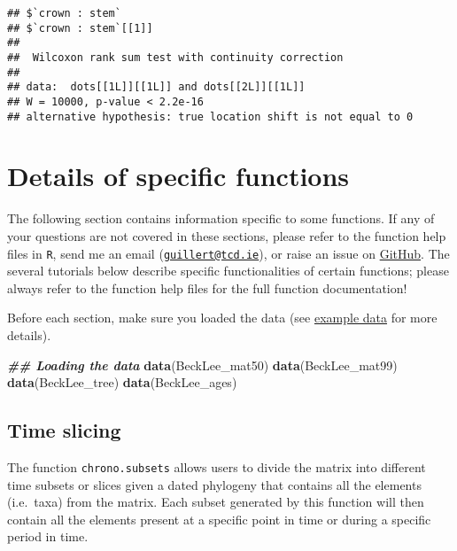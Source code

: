 \documentclass[
]{book}
\newenvironment{Shaded}{\begin{snugshade}}{\end{snugshade}}
\newcommand{\DocumentationTok}[1]{\textcolor[rgb]{0.56,0.35,0.01}{\textbf{\textit{#1}}}}
\newcommand{\FunctionTok}[1]{\textcolor[rgb]{0.13,0.29,0.53}{\textbf{#1}}}
\newcommand{\NormalTok}[1]{#1}
\begin{document}
\begin{verbatim}
## $`crown : stem`
## $`crown : stem`[[1]]
## 
##  Wilcoxon rank sum test with continuity correction
## 
## data:  dots[[1L]][[1L]] and dots[[2L]][[1L]]
## W = 10000, p-value < 2.2e-16
## alternative hypothesis: true location shift is not equal to 0
\end{verbatim}

\hypertarget{details-of-specific-functions}{%
\chapter{Details of specific functions}\label{details-of-specific-functions}}

The following section contains information specific to some functions.
If any of your questions are not covered in these sections, please refer to the function help files in \texttt{R}, send me an email (\href{mailto:guillert@tcd.ie}{\nolinkurl{guillert@tcd.ie}}), or raise an issue on \href{https://github.com/TGuillerme/dispRity/issues}{GitHub}.
The several tutorials below describe specific functionalities of certain functions; please always refer to the function help files for the full function documentation!

Before each section, make sure you loaded the \citet{beckancient2014} data (see \protect\hyperlink{example-data}{example data} for more details).

\begin{Shaded}
\begin{Highlighting}[]
\DocumentationTok{\#\# Loading the data}
\FunctionTok{data}\NormalTok{(BeckLee\_mat50)}
\FunctionTok{data}\NormalTok{(BeckLee\_mat99)}
\FunctionTok{data}\NormalTok{(BeckLee\_tree)}
\FunctionTok{data}\NormalTok{(BeckLee\_ages)}
\end{Highlighting}
\end{Shaded}

\hypertarget{chrono-subsets}{%
\section{Time slicing}\label{chrono-subsets}}

The function \texttt{chrono.subsets} allows users to divide the matrix into different time subsets or slices given a dated phylogeny that contains all the elements (i.e.~taxa) from the matrix.
Each subset generated by this function will then contain all the elements present at a specific point in time or during a specific period in time.
\end{document}
